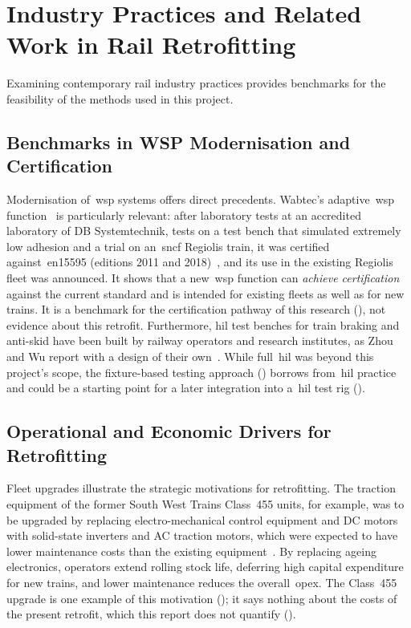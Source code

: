\section{Industry Practices and Related Work in Rail Retrofitting}
\label{sec:industry_practices}
Examining contemporary rail industry practices provides benchmarks for the feasibility of the methods used in this project.

\subsection{Benchmarks in WSP Modernisation and Certification}
\label{subsec:wsp_benchmarks}
Modernisation of~\gls{wsp} systems offers direct precedents. Wabtec's adaptive~\gls{wsp} function~\cite{wabtec_wsp_cert_2022} is particularly relevant: after laboratory tests at an accredited laboratory of DB Systemtechnik, tests on a test bench that simulated extremely low adhesion and a trial on an~\gls{sncf} Regiolis train, it was certified against~\gls{en15595} (editions 2011 and 2018)~\cite{en15595_2018}, and its use in the existing Regiolis fleet was announced. It shows that a new~\gls{wsp} function can \textit{achieve certification} against the current standard and is intended for existing fleets as well as for new trains. It is a benchmark for the certification pathway of this research (), not evidence about this retrofit. Furthermore, \gls{hil} test benches for train braking and anti-skid have been built by railway operators and research institutes, as Zhou and Wu report with a design of their own~\cite[p.~155]{zhou_wu_2020}. While full~\gls{hil} was beyond this project's scope, the fixture-based testing approach () borrows from~\gls{hil} practice and could be a starting point for a later integration into a~\gls{hil} test rig ().

\subsection{Operational and Economic Drivers for Retrofitting}
\label{subsec:operational_economic_drivers}
Fleet upgrades illustrate the strategic motivations for retrofitting. The traction equipment of the former South West Trains Class~455 units, for example, was to be upgraded by replacing electro-mechanical control equipment and DC motors with solid-state inverters and AC traction motors, which were expected to have lower maintenance costs than the existing equipment~\cite{rg_class455_upgrade_2013}. By replacing ageing electronics, operators extend rolling stock life, deferring high capital expenditure for new trains, and lower maintenance reduces the overall~\gls{opex}. The Class~455 upgrade is one example of this motivation (); it says nothing about the costs of the present retrofit, which this report does not quantify ().

